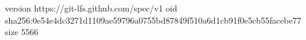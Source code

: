 version https://git-lfs.github.com/spec/v1
oid sha256:0e54e4dc3271d1109ae59796a0755bd87849f510a6d1cb91f0e5cb55facebe77
size 5566
